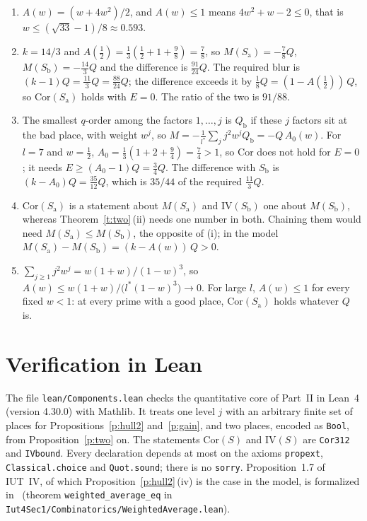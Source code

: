 \documentclass[11pt,a4paper]{article}
\newcommand{\Sa}{S_{\mathrm a}}
\newcommand{\Sb}{S_{\mathrm b}}
\newcommand{\lean}[1]{\texttt{#1}}
\theoremstyle{plain}
\theoremstyle{definition}
\theoremstyle{remark}
\begin{document}
\begin{enumerate}[label=\arabic*.]
\item $A(w)=(w+4w^2)/2$, and $A(w)\le1$ means $4w^2+w-2\le0$, that is $w\le(\sqrt{33}-1)/8\approx0.593$.
\item $k=14/3$ and $A(\frac12)=\frac13(\frac12+1+\frac98)=\frac78$, so $M(\Sa)=-\frac78Q$, $M(\Sb)=-\frac{14}3Q$ and the
difference is $\frac{91}{24}Q$. The required blur is $(k-1)Q=\frac{11}3Q=\frac{88}{24}Q$; the difference exceeds it by
$\frac18Q=(1-A(\frac12))\,Q$, so $\mathrm{Cor}(\Sa)$ holds with $E=0$. The ratio of the two is $91/88$.
\item The smallest $q$-order among the factors $1,\dots,j$ is $Q_{\mathrm b}$ if these $j$ factors sit at the bad
place, with weight $w^j$, so $M=-\frac1{l^*}\sum_jj^2w^jQ_{\mathrm b}=-Q\,A_0(w)$. For $l=7$ and $w=\frac12$,
$A_0=\frac13(1+2+\frac94)=\frac74>1$, so $\mathrm{Cor}$ does not hold for $E=0$; it needs $E\ge(A_0-1)Q=\frac34Q$. The
difference with $\Sb$ is $(k-A_0)Q=\frac{35}{12}Q$, which is $35/44$ of the required $\frac{11}3Q$.
\item $\mathrm{Cor}(\Sa)$ is a statement about $M(\Sa)$ and $\mathrm{IV}(\Sb)$ one about $M(\Sb)$, whereas
Theorem~\ref{t:two}\,(ii) needs one number in both. Chaining them would need $M(\Sa)\le M(\Sb)$, the opposite of (i);
in the model $M(\Sa)-M(\Sb)=(k-A(w))\,Q>0$.
\item $\sum_{j\ge1}j^2w^j=w(1+w)/(1-w)^3$, so $A(w)\le w(1+w)/\bigl(l^*(1-w)^3\bigr)\to0$. For large $l$, $A(w)\le1$
for every fixed $w<1$: at every prime with a good place, $\mathrm{Cor}(\Sa)$ holds whatever $Q$ is.
\end{enumerate}

\appendix
\section{Verification in Lean}\label{app:lean}
The file \texttt{lean/Components.lean} checks the quantitative core of Part~II in Lean~4 (version 4.30.0) with
Mathlib. It treats one level $j$ with an arbitrary finite set of places for Propositions~\ref{p:hull2}
and~\ref{p:gain}, and two places, encoded as \texttt{Bool}, from Proposition~\ref{p:two} on. The statements
$\mathrm{Cor}(S)$ and $\mathrm{IV}(S)$ are \lean{Cor312} and \lean{IVbound}. Every declaration depends at most on the
axioms \texttt{propext}, \texttt{Classical.choice} and \texttt{Quot.sound}; there is no \texttt{sorry}. Proposition~1.7 of
IUT~IV, of which Proposition~\ref{p:hull2}\,(iv) is the case in the model, is formalized in~\cite{LANAiut} (theorem
\lean{weighted\_average\_eq} in \texttt{Iut4Sec1/Combinatorics/WeightedAverage.lean}).
\end{document}
